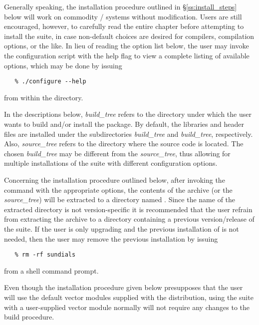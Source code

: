 Generally speaking, the installation procedure outlined in
\S\ref{ss:install_steps} below will work on commodity {\linux}/{\unix} systems
without modification. Users are still encouraged, however, to carefully read
the entire chapter before attempting to install the {\sundials} suite, in case
non-default choices are desired for compilers, compilation options, or the like.
In lieu of reading the option list below, the user may invoke the configuration
script with the help flag to view a complete listing of available options, which
may be done by issuing 
\begin{verbatim}
   % ./configure --help 
\end{verbatim}
from within the  directory.

In the descriptions below, {\em build\_tree} refers to the directory under
which the user wants to build and/or install the {\sundials} package. By
default, the {\sundials} libraries and header files are installed under the
subdirectories {\em build\_tree} and {\em build\_tree},
respectively. Also, {\em source\_tree} refers to the directory where the
{\sundials} source code is located. The chosen {\em build\_tree} may be
different from the {\em source\_tree}, thus allowing for multiple installations
of the {\sundials} suite with different configuration options.

Concerning the installation procedure outlined below, after invoking the
 command with the appropriate options, the contents of the
{\sundials} archive (or the {\em source\_tree}) will be extracted to a
directory named . Since the name of the extracted directory
is not version-specific it is recommended that the user refrain from
extracting the archive to a directory containing a previous version/release
of the {\sundials} suite. If the user is only upgrading and the previous 
installation of {\sundials} is not needed, then the user may remove the
previous installation by issuing 
\begin{verbatim}
   % rm -rf sundials
\end{verbatim}
from a shell command prompt.

Even though the installation procedure given below presupposes that the user
will use the default vector modules supplied with the distribution, using the
{\sundials} suite with a user-supplied vector module normally will not require
any changes to the build procedure.  


